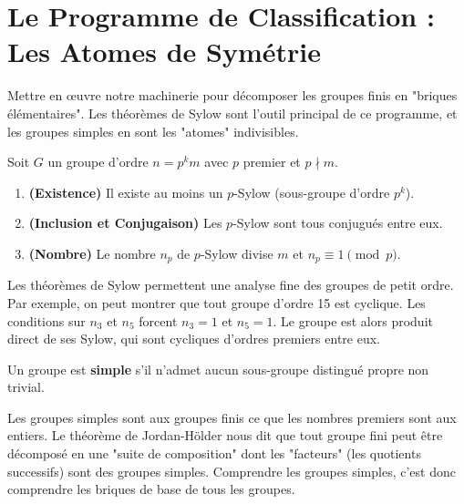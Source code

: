 \section{Le Programme de Classification : Les Atomes de Symétrie}

\begin{objectif}
    Mettre en œuvre notre machinerie pour décomposer les groupes finis en "briques élémentaires". Les théorèmes de Sylow sont l'outil principal de ce programme, et les groupes simples en sont les "atomes" indivisibles.
\end{objectif}

\begin{theorem}
    Soit $G$ un groupe d'ordre $n=p^k m$ avec $p$ premier et $p \nmid m$.
    \begin{enumerate}
        \item \textbf{(Existence)} Il existe au moins un $p$-Sylow (sous-groupe d'ordre $p^k$).
        \item \textbf{(Inclusion et Conjugaison)} Les $p$-Sylow sont tous conjugués entre eux.
        \item \textbf{(Nombre)} Le nombre $n_p$ de $p$-Sylow divise $m$ et $n_p \equiv 1 \pmod{p}$.
    \end{enumerate}
\end{theorem}

\begin{application}
    Les théorèmes de Sylow permettent une analyse fine des groupes de petit ordre. Par exemple, on peut montrer que tout groupe d'ordre 15 est cyclique. Les conditions sur $n_3$ et $n_5$ forcent $n_3=1$ et $n_5=1$. Le groupe est alors produit direct de ses Sylow, qui sont cycliques d'ordres premiers entre eux.
\end{application}

\begin{definition}
    Un groupe est \textbf{simple} s'il n'admet aucun sous-groupe distingué propre non trivial.
\end{definition}

\begin{remark}
    Les groupes simples sont aux groupes finis ce que les nombres premiers sont aux entiers. Le théorème de Jordan-Hölder nous dit que tout groupe fini peut être décomposé en une "suite de composition" dont les "facteurs" (les quotients successifs) sont des groupes simples. Comprendre les groupes simples, c'est donc comprendre les briques de base de tous les groupes.
\end{remark}

